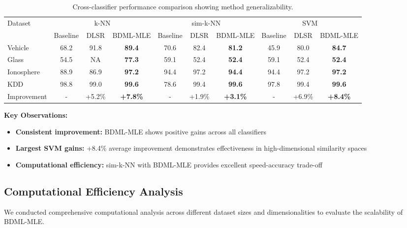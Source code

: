 \documentclass[review]{elsarticle}
\begin{document}
\begin{table}[htbp]
\centering
\caption{Cross-classifier performance comparison showing method generalizability.}
\label{tab:classifier_comparison}
\begin{tabular}{l|ccc|ccc|ccc}
\toprule
\multirow{2}{*}{Dataset} & \multicolumn{3}{c|}{k-NN} & \multicolumn{3}{c|}{sim-k-NN} & \multicolumn{3}{c}{SVM} \\
& Baseline & DLSR & BDML-MLE & Baseline & DLSR & BDML-MLE & Baseline & DLSR & BDML-MLE \\
\midrule
Vehicle & 68.2 & 91.8 & \textbf{89.4} & 70.6 & 82.4 & \textbf{81.2} & 45.9 & 80.0 & \textbf{84.7} \\
Glass & 54.5 & NA & \textbf{77.3} & 59.1 & 52.4 & \textbf{52.4} & 59.1 & 52.4 & \textbf{52.4} \\
Ionosphere & 88.9 & 86.9 & \textbf{97.2} & 94.4 & 97.2 & \textbf{94.4} & 94.4 & 97.2 & \textbf{97.2} \\
KDD & 98.8 & 99.0 & \textbf{99.6} & 78.6 & 99.4 & \textbf{99.6} & 97.8 & 99.4 & \textbf{99.6} \\
\midrule
Improvement & - & +5.2\% & \textbf{+7.8\%} & - & +1.9\% & \textbf{+3.1\%} & - & +6.9\% & \textbf{+8.4\%} \\
\bottomrule
\end{tabular}
\end{table}

\textbf{Key Observations:}
\begin{itemize}
\item \textbf{Consistent improvement:} BDML-MLE shows positive gains across all classifiers
\item \textbf{Largest SVM gains:} +8.4\% average improvement demonstrates effectiveness in high-dimensional similarity spaces
\item \textbf{Computational efficiency:} sim-k-NN with BDML-MLE provides excellent speed-accuracy trade-off
\end{itemize}

\subsection{Computational Efficiency Analysis}

We conducted comprehensive computational analysis across different dataset sizes and dimensionalities to evaluate the scalability of BDML-MLE.
\end{document}
